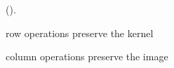 \begin{theorem}
    ().
    
    row operations preserve the kernel

    column operations preserve the image
\end{theorem}

